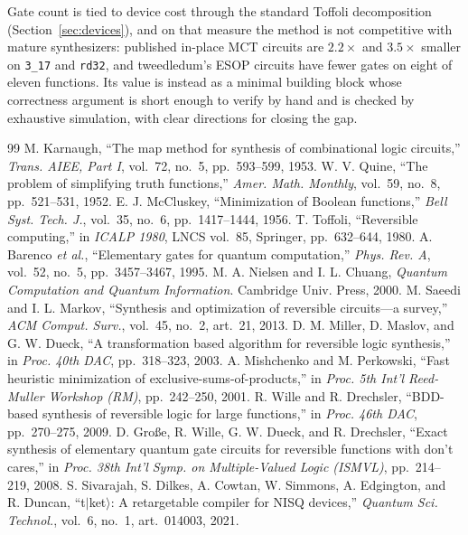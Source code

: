\documentclass[conference]{IEEEtran}
\theoremstyle{plain}
\begin{document}
Gate count is tied to device cost through the standard Toffoli
decomposition (Section~\ref{sec:devices}), and on that measure the method
is not competitive with mature synthesizers: published in-place MCT
circuits are $2.2\times$ and $3.5\times$ smaller on \texttt{3\_17} and
\texttt{rd32}, and tweedledum's ESOP circuits have fewer gates on eight of
eleven functions. Its value is
instead as a minimal building block whose correctness argument is short
enough to verify by hand and is checked by exhaustive simulation, with clear
directions for closing the gap.

\begin{thebibliography}{99}
 M. Karnaugh, ``The map method for synthesis of combinational logic circuits,'' \emph{Trans. AIEE, Part I}, vol.~72, no.~5, pp.~593--599, 1953.
 W. V. Quine, ``The problem of simplifying truth functions,'' \emph{Amer. Math. Monthly}, vol.~59, no.~8, pp.~521--531, 1952.
 E. J. McCluskey, ``Minimization of Boolean functions,'' \emph{Bell Syst. Tech. J.}, vol.~35, no.~6, pp.~1417--1444, 1956.
 T. Toffoli, ``Reversible computing,'' in \emph{ICALP 1980}, LNCS vol.~85, Springer, pp.~632--644, 1980.
 A. Barenco \emph{et al.}, ``Elementary gates for quantum computation,'' \emph{Phys. Rev. A}, vol.~52, no.~5, pp.~3457--3467, 1995.
 M. A. Nielsen and I. L. Chuang, \emph{Quantum Computation and Quantum Information}. Cambridge Univ. Press, 2000.
 M. Saeedi and I. L. Markov, ``Synthesis and optimization of reversible circuits---a survey,'' \emph{ACM Comput. Surv.}, vol.~45, no.~2, art.~21, 2013.
 D. M. Miller, D. Maslov, and G. W. Dueck, ``A transformation based algorithm for reversible logic synthesis,'' in \emph{Proc. 40th DAC}, pp.~318--323, 2003.
 A. Mishchenko and M. Perkowski, ``Fast heuristic minimization of exclusive-sums-of-products,'' in \emph{Proc. 5th Int'l Reed-Muller Workshop (RM)}, pp.~242--250, 2001.
 R. Wille and R. Drechsler, ``BDD-based synthesis of reversible logic for large functions,'' in \emph{Proc. 46th DAC}, pp.~270--275, 2009.
 D. Gro{\ss}e, R. Wille, G. W. Dueck, and R. Drechsler, ``Exact synthesis of elementary quantum gate circuits for reversible functions with don't cares,'' in \emph{Proc. 38th Int'l Symp. on Multiple-Valued Logic (ISMVL)}, pp.~214--219, 2008.
 S. Sivarajah, S. Dilkes, A. Cowtan, W. Simmons, A. Edgington, and R. Duncan, ``t$|$ket$\rangle$: A retargetable compiler for NISQ devices,'' \emph{Quantum Sci. Technol.}, vol.~6, no.~1, art.~014003, 2021.

\end{thebibliography}
\end{document}
